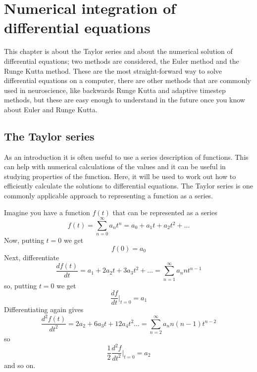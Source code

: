 \documentclass[12pt]{article}
\begin{document}
\section*{Numerical integration of differential equations} 

This chapter is about the Taylor series and about the numerical
solution of differential equations; two methods are considered, the
Euler method and the Runge Kutta method. These are the most
straight-forward way to solve differential equations on a computer,
there are other methods that are commonly used in neuroscience, like
backwards Runge Kutta and adaptive timestep methods, but these are
easy enough to understand in the future once you know about Euler and
Runge Kutta.

\subsection*{The Taylor series}

As an introduction it is often useful to use a series description of
functions. This can help with numerical calculations of the values and
it can be useful in studying properties of the function. Here, it will
be used to work out how to efficiently calculate the solutions to
differential equations. The Taylor series is one commonly applicable
approach to representing a function as a series.

Imagine you have a function $f(t)$ that can be represented as a series
\begin{equation}
f(t)=\sum_{n=0}^\infty{a_nt^n}=a_0+a_1t+a_2t^2+\ldots
\end{equation}
Now, putting $t=0$ we get
\begin{equation}
f(0)=a_0
\end{equation}
Next, differentiate
\begin{equation}
\frac{df(t)}{dt}=a_1+2a_2t+3a_3t^2+\ldots=\sum_{n=1}^\infty{a_nnt^{n-1}}
\end{equation}
so, putting $t=0$ we get
\begin{equation}
\frac{df}{dt}|_{t=0}=a_1
\end{equation}
Differentiating again gives
\begin{equation}
\frac{d^2f(t)}{dt^2}=2a_2+6a_3t+12a_4t^2\ldots=\sum_{n=2}^\infty{a_nn(n-1)t^{n-2}}
\end{equation}
so
\begin{equation}
\frac{1}{2}\frac{d^2f}{dt^2}|_{t=0}=a_2
\end{equation}
and so on.
\end{document}
